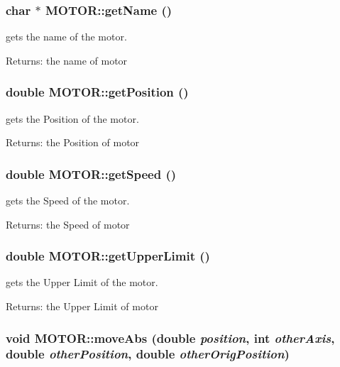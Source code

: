 \subsubsection{\setlength{\rightskip}{0pt plus 5cm}char $\ast$ MOTOR::get\-Name ()}\label{classMOTOR_f3afc1b048f193d93f117080eb47897a}


gets the name of the motor. \begin{Desc}
\item[Returns:]the name of motor \end{Desc}
\subsubsection{\setlength{\rightskip}{0pt plus 5cm}double MOTOR::get\-Position ()}\label{classMOTOR_f502c920501c6293ecef4693df84ef61}


gets the Position of the motor. \begin{Desc}
\item[Returns:]the Position of motor \end{Desc}
\subsubsection{\setlength{\rightskip}{0pt plus 5cm}double MOTOR::get\-Speed ()}\label{classMOTOR_efb046ae56e4391648f53b603541d10d}


gets the Speed of the motor. \begin{Desc}
\item[Returns:]the Speed of motor \end{Desc}
\subsubsection{\setlength{\rightskip}{0pt plus 5cm}double MOTOR::get\-Upper\-Limit ()}\label{classMOTOR_5fc68f948690dce2c3a9a45e470d8187}


gets the Upper Limit of the motor. \begin{Desc}
\item[Returns:]the Upper Limit of motor \end{Desc}
\subsubsection{\setlength{\rightskip}{0pt plus 5cm}void MOTOR::move\-Abs (double {\em position}, int {\em other\-Axis}, double {\em other\-Position}, double {\em other\-Orig\-Position})}\label{classMOTOR_4a437a418f537819d681ebb5a7479dbc}


